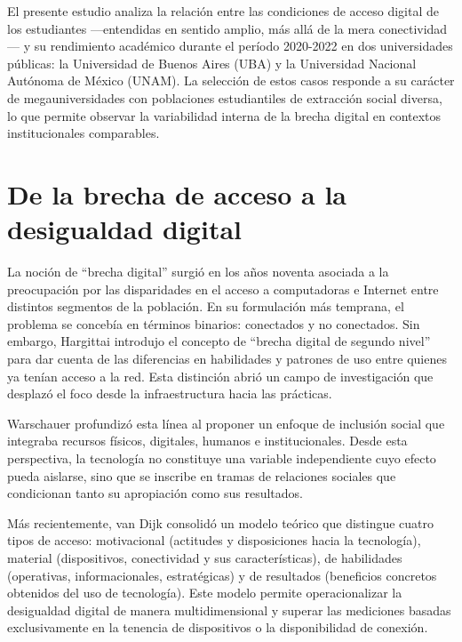 \documentclass{article}
\begin{document}
El presente estudio analiza la relación entre las condiciones de acceso digital de los estudiantes —entendidas en sentido amplio, más allá de la mera conectividad— y su rendimiento académico durante el período 2020-2022 en dos universidades públicas: la Universidad de Buenos Aires (UBA) y la Universidad Nacional Autónoma de México (UNAM). La selección de estos casos responde a su carácter de megauniversidades con poblaciones estudiantiles de extracción social diversa, lo que permite observar la variabilidad interna de la brecha digital en contextos institucionales comparables.


\section{De la brecha de acceso a la desigualdad digital}
La noción de “brecha digital” surgió en los años noventa asociada a la preocupación por las disparidades en el acceso a computadoras e Internet entre distintos segmentos de la población. En su formulación más temprana, el problema se concebía en términos binarios: conectados y no conectados. Sin embargo, Hargittai \autocite*{2565-HARGITTAI2002} introdujo el concepto de “brecha digital de segundo nivel” para dar cuenta de las diferencias en habilidades y patrones de uso entre quienes ya tenían acceso a la red. Esta distinción abrió un campo de investigación que desplazó el foco desde la infraestructura hacia las prácticas.

Warschauer \autocite*{2562-WARSCHAUER2004} profundizó esta línea al proponer un enfoque de inclusión social que integraba recursos físicos, digitales, humanos e institucionales. Desde esta perspectiva, la tecnología no constituye una variable independiente cuyo efecto pueda aislarse, sino que se inscribe en tramas de relaciones sociales que condicionan tanto su apropiación como sus resultados.

Más recientemente, van Dijk \autocite*{2563-VANDIJK2020} consolidó un modelo teórico que distingue cuatro tipos de acceso: motivacional (actitudes y disposiciones hacia la tecnología), material (dispositivos, conectividad y sus características), de habilidades (operativas, informacionales, estratégicas) y de resultados (beneficios concretos obtenidos del uso de tecnología). Este modelo permite operacionalizar la desigualdad digital de manera multidimensional y superar las mediciones basadas exclusivamente en la tenencia de dispositivos o la disponibilidad de conexión.
\end{document}
